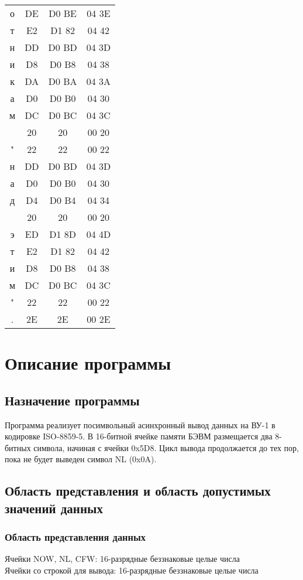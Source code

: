 \begin{center}
\begin{tabular}{|c|c|c|c|}
	о & DE & D0 BE & 04 3E\\
	т & E2 & D1 82 & 04 42\\
	н & DD & D0 BD & 04 3D\\
	и & D8 & D0 B8 & 04 38\\
	к & DA & D0 BA & 04 3A\\
	а & D0 & D0 B0 & 04 30\\
	м & DC & D0 BC & 04 3C\\
	& 20 & 20 & 00 20\\
	" & 22 & 22 & 00 22\\
	н & DD & D0 BD & 04 3D\\
	а & D0 & D0 B0 & 04 30\\
	д & D4 & D0 B4 & 04 34\\
	& 20 & 20 & 00 20\\
	э & ED & D1 8D & 04 4D\\
	т & E2 & D1 82 & 04 42\\
	и & D8 & D0 B8 & 04 38\\
	м & DC & D0 BC & 04 3C\\
	" & 22 & 22 & 00 22\\
	. & 2E & 2E & 00 2E\\ 
	\hline
\end{tabular}
\end{center}

\section{Описание программы}
\subsection{Назначение программы}
Программа реализует посимвольный асинхронный вывод данных на ВУ-1 в кодировке ISO-8859-5. В 16-битной ячейке памяти БЭВМ размещается два 8-битных символа, начиная с ячейки 0x5D8. Цикл вывода продолжается до тех пор, пока не будет выведен символ NL (0x0A).

\subsection{Область представления и область допустимых значений данных}
\subsubsection{Область представления данных}
\noindent Ячейки NOW, NL, CFW: 16-разрядные беззнаковые целые числа\\
Ячейки со строкой для вывода: 16-разрядные беззнаковые целые числа

